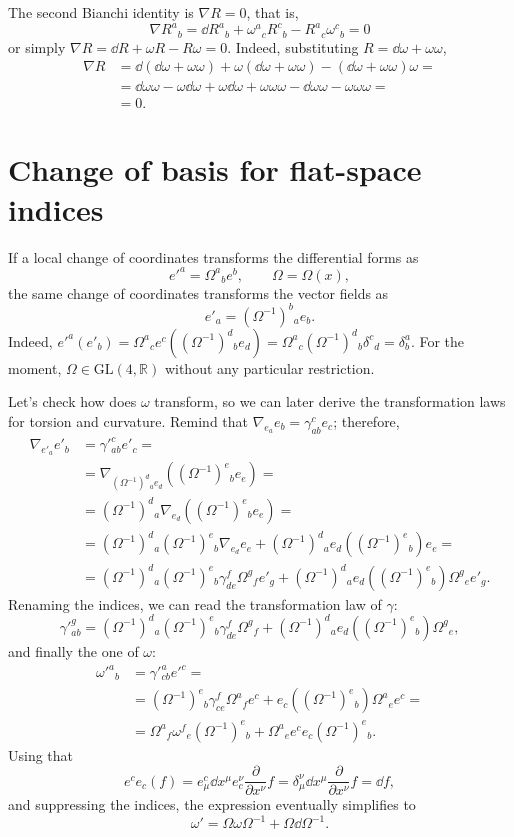 \documentclass[a4paper,12pt]{book}
\begin{document}
The second Bianchi identity is $\nabla R=0$, that is,
\[\nabla R^a{}_b=\dd R^a{}_b+\omega^a{}_cR^c{}_b-R^a{}_c\omega^c{}_b=0\]
or simply $\nabla R=\dd R+\omega R-R\omega=0$. Indeed, substituting $R=\dd\omega+\omega\omega$,
\begin{align*}
\nabla R&=\dd(\dd\omega+\omega\omega)+\omega(\dd\omega+\omega\omega)-(\dd\omega+\omega\omega)\omega=\\
&=\dd\omega\omega-\omega\dd\omega+\omega\dd\omega+\omega\omega\omega-\dd\omega\omega-\omega\omega\omega=\\
&=0.
\end{align*}

\section{Change of basis for flat-space indices}
If a local change of coordinates transforms the differential forms as
\[e'^a=\Omega^a{}_be^b,\qquad \Omega=\Omega(x),\]
the same change of coordinates transforms the vector fields as
\[e'_a=(\Omega^{-1})^b{}_ae_b.\]
Indeed, $e'^a(e'_b)=\Omega^a{}_ce^c((\Omega^{-1})^d{}_be_d)=\Omega^a{}_c(\Omega^{-1})^d{}_b\delta^c{}_d=\delta^a_b$. For the moment, $\Omega\in\text{GL}(4,\mathbb{R})$ without any particular restriction.

Let's check how does $\omega$ transform, so we can later derive the transformation laws for torsion and curvature. Remind that $\nabla_{e_a}e_b=\gamma_{ab}^ce_c$; therefore,
\begin{align*}
\nabla_{e'_a}e'_b&=\gamma'^c_{ab}e'_c=\\
&=\nabla_{(\Omega^{-1})^d{}_ae_d}((\Omega^{-1})^e{}_be_e)=\\
&=(\Omega^{-1})^d{}_a\nabla_{e_d}((\Omega^{-1})^e{}_be_e)=\\
&=(\Omega^{-1})^d{}_a(\Omega^{-1})^e{}_b\nabla_{e_d}e_e+(\Omega^{-1})^d{}_ae_d((\Omega^{-1})^e{}_b)e_e=\\
&=(\Omega^{-1})^d{}_a(\Omega^{-1})^e{}_b\gamma_{de}^f\Omega^g{}_fe'_g+(\Omega^{-1})^d{}_ae_d((\Omega^{-1})^e{}_b)\Omega^g{}_ee'_g.
\end{align*}
Renaming the indices, we can read the transformation law of $\gamma$:
\[\gamma'^g_{ab}=(\Omega^{-1})^d{}_a(\Omega^{-1})^e{}_b\gamma_{de}^f\Omega^g{}_f+(\Omega^{-1})^d{}_ae_d((\Omega^{-1})^e{}_b)\Omega^g{}_e,\]
and finally the one of $\omega$:
\begin{align*}
\omega'^a{}_b&=\gamma'^a_{cb}e'^c=\\
&=(\Omega^{-1})^e{}_b\gamma_{ce}^f\Omega^a{}_fe^c+e_c((\Omega^{-1})^e{}_b)\Omega^a{}_ee^c=\\
&=\Omega^a{}_f\omega^f{}_e(\Omega^{-1})^e{}_b+\Omega^a{}_ee^ce_c(\Omega^{-1})^e{}_b.
\end{align*}
Using that
\[e^ce_c(f)=e^c_\mu\dd x^\mu e^\nu_c\frac{\partial}{\partial x^\nu}f=\delta^\nu_\mu\dd x^\mu\frac{\partial}{\partial x^\nu}f=\dd f,\]
and suppressing the indices, the expression eventually simplifies to
\begin{equation}
\omega'=\Omega\omega\Omega^{-1}+\Omega\dd\Omega^{-1}.
\label{eqn:transomega}
\end{equation}
\end{document}

